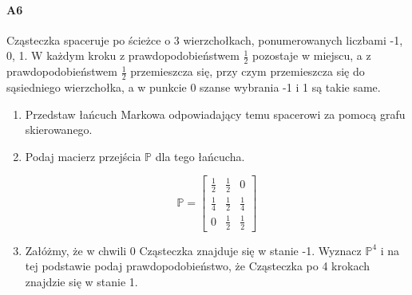 \documentclass[a4paper,12pt]{article}
\theoremstyle{definition}%
\theoremstyle{definition}
\theoremstyle{problem}
\begin{document}
\paragraph{A6} Cząsteczka spaceruje po ścieżce o 3 wierzchołkach, ponumerowanych liczbami -1, 0, 1. W każdym kroku z prawdopodobieństwem $\frac{1}{2}$ pozostaje w miejscu, a z prawdopodobieństwem $\frac{1}{2}$ przemieszcza się, przy czym przemieszcza się do sąsiedniego wierzchołka, a w punkcie 0 szanse wybrania -1 i 1 są takie same.
\begin{enumerate}[label=\alph*)]
\item Przedstaw łańcuch Markowa odpowiadający temu spacerowi za pomocą grafu skierowanego.

\begin{figure}[H]
\centering
{}
\end{figure}
\item Podaj macierz przejścia $\mathbb{P}$ dla tego łańcucha.

$$\mathbb{P}=\begin{bmatrix}
\frac{1}{2}&\frac{1}{2}&0\\
\frac{1}{4}&\frac{1}{2}&\frac{1}{4}\\
0&\frac{1}{2}&\frac{1}{2}
\end{bmatrix}$$
\item Załóżmy, że w chwili 0 Cząsteczka znajduje się w stanie -1. Wyznacz $\mathbb{P}^4$ i na tej podstawie podaj prawdopodobieństwo, że Cząsteczka po 4 krokach znajdzie się w stanie 1.


\end{enumerate}
\end{document}
